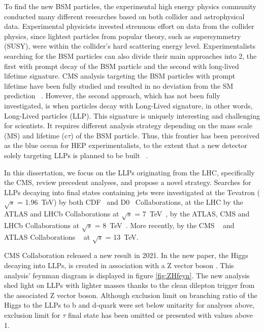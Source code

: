 To find the new BSM particles, the experimental high energy physics community conducted many different researches based on both collider and astrophysical data.
Experimental physicists invested strenuous effort on data from the collider physics, since lightest particles from popular theory, such as supersymmetry (SUSY), were within the collider's hard scattering energy level.
Experimentalists searching for the BSM particles can also divide their main approaches into 2, the first with prompt decay of the BSM particle and the second with long-lived lifetime signature.
CMS analysis targeting the BSM particles with prompt lifetime have been fully studied and resulted in no deviation from the SM prediction ~\cite{SUSY}.
However, the second approach, which has not been fully investigated, is when particles decay with Long-Lived signature, in other words, Long-Lived particles (LLP).
This signature is uniquely interesting and challenging for scientists.
It requires different analysis strategy depending on the mass scale (MS) and lifetime (c$\tau$) of the BSM particle.
Thus, this frontier has been perceived as the blue ocean for HEP experimentalists, to the extent that a new detector solely targeting LLPs is planned to be built ~\cite{Barron:2022aac}.

In this dissertation, we focus on the LLPs originating from the LHC, specifically the CMS, review precedent analyses, and propose a novel strategy. 
Searches for LLPs decaying into final states containing jets were investigated
at the Tevatron ( $\sqrt{s}$ = 1.96~TeV) by both CDF~\cite{Aaltonen:2011rja} and D0~\cite{Abazov:2009ik} Collaborations,
at the LHC by the ATLAS and LHCb Collaborations at $\sqrt{s}$ = 7~TeV~\cite{ATLAS:2012av,Aaij:2014nma},
by the ATLAS, CMS and LHCb Collaborations at $\sqrt{s}$ = 8~TeV~\cite{Aad:2015uaa,Aad:2015rba,PhysRevD.91.012007,Aad:2015asa,Aaij:2017mic,Aaij:2016xmb,Aaij:2015ica}.
More recently, by the CMS ~\cite{Sirunyan:2017jdo,displacedvertices,displacedjets2016,delayedjets,emergingjets,CMS-PAS-EXO-19-021}
 and ATLAS Collaborations ~\cite{Aaboud:2018iil,Aaboud:2018jbr,Aaboud:2018arf,Aaboud:2018aqj,Aaboud:2018kbe,Aaboud:2019trc,Aaboud:2019opc,Aad:2019kiz,Aad:2019pfm,Aad:2019tcc,Aad:2019xav,Aad:2019tua} at $\sqrt{s}$ = 13~TeV. 

CMS Collaboration released a new result in 2021. 
In the new paper, the Higgs decaying into LLPs, is created in association with a Z vector boson \cite{ZHAN}.
This analysis' feynman diagram is displayed in figure \ref{fig:ZHfeyn}.
The new analysis shed light on LLPs with lighter masses thanks to the clean dilepton trigger from the associated Z vector boson.
Although exclusion limit on branching ratio of the Higgs to the LLPs to b and d-quark were set below unitarity for analyses above, exclusion limit for $\tau$ final state has been omitted or presented with values above 1.  

